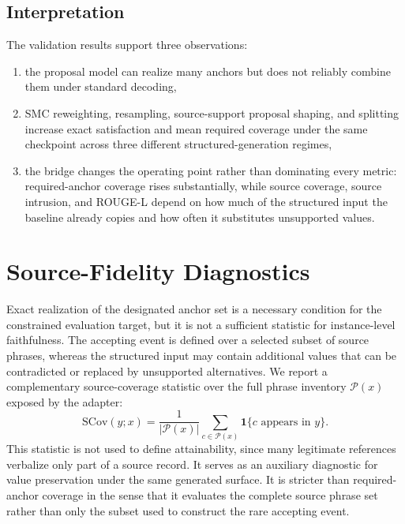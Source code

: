 \documentclass[11pt]{article}
\begin{document}
\FloatBarrier

\subsection{Interpretation}
The validation results support three observations:
\begin{enumerate}[leftmargin=1.5em]
  \item the proposal model can realize many anchors but does not reliably combine them under standard decoding,
  \item SMC reweighting, resampling, source-support proposal shaping, and splitting increase exact satisfaction and mean required coverage under the same checkpoint across three different structured-generation regimes,
  \item the bridge changes the operating point rather than dominating every metric: required-anchor coverage rises substantially, while source coverage, source intrusion, and ROUGE-L depend on how much of the structured input the baseline already copies and how often it substitutes unsupported values.
\end{enumerate}

\section{Source-Fidelity Diagnostics}
Exact realization of the designated anchor set is a necessary condition for the constrained evaluation target, but it is not a sufficient statistic for instance-level faithfulness. The accepting event is defined over a selected subset of source phrases, whereas the structured input may contain additional values that can be contradicted or replaced by unsupported alternatives. We report a complementary source-coverage statistic over the full phrase inventory $\mathcal{P}(x)$ exposed by the adapter:
\[
\mathrm{SCov}(y;x)
=
\frac{1}{|\mathcal{P}(x)|}
\sum_{c \in \mathcal{P}(x)}
\mathbf{1}\{c \text{ appears in } y\}.
\]
This statistic is not used to define attainability, since many legitimate references verbalize only part of a source record. It serves as an auxiliary diagnostic for value preservation under the same generated surface. It is stricter than required-anchor coverage in the sense that it evaluates the complete source phrase set rather than only the subset used to construct the rare accepting event.
\end{document}

